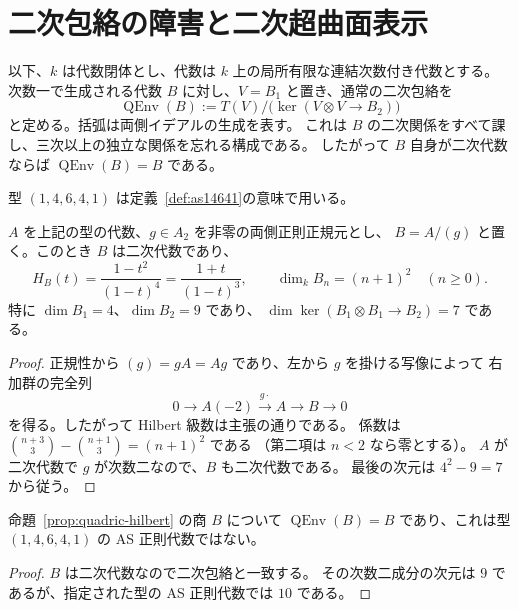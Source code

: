 \section{二次包絡の障害と二次超曲面表示}
\label{sec:quadric-envelope-obstruction}

以下、$k$ は代数閉体とし、代数は $k$ 上の局所有限な連結次数付き代数とする。
次数一で生成される代数 $B$ に対し、$V=B_1$ と置き、通常の二次包絡を
\[
 \operatorname{QEnv}(B)
 :=T(V)/\bigl(\ker(V\otimes V\longrightarrow B_2)\bigr)
\]
と定める。括弧は両側イデアルの生成を表す。
これは $B$ の二次関係をすべて課し、三次以上の独立な関係を忘れる構成である。
したがって $B$ 自身が二次代数ならば
$\operatorname{QEnv}(B)=B$ である。

型 $(1,4,6,4,1)$ は定義~\ref{def:as14641}の意味で用いる。

\begin{proposition}[次数二の正則元による商の数値]
\label{prop:quadric-hilbert}
$A$ を上記の型の代数、$g\in A_2$ を非零の両側正則正規元とし、
$B=A/(g)$ と置く。このとき $B$ は二次代数であり、
\[
 H_B(t)=\frac{1-t^2}{(1-t)^4}
       =\frac{1+t}{(1-t)^3},\qquad
 \dim_k B_n=(n+1)^2\quad(n\geq0).
\]
特に $\dim B_1=4$、$\dim B_2=9$ であり、
$\dim\ker(B_1\otimes B_1\to B_2)=7$ である。
\end{proposition}

\begin{proof}
正規性から $(g)=gA=Ag$ であり、左から $g$ を掛ける写像によって
右加群の完全列
\[
 0\longrightarrow A(-2)\xrightarrow{\,g\cdot\,}A
 \longrightarrow B\longrightarrow0
\]
を得る。したがって Hilbert 級数は主張の通りである。
係数は $\binom{n+3}{3}-\binom{n+1}{3}=(n+1)^2$ である
（第二項は $n<2$ なら零とする）。
$A$ が二次代数で $g$ が次数二なので、$B$ も二次代数である。
最後の次元は $4^2-9=7$ から従う。
\end{proof}

\begin{corollary}[通常の二次包絡を用いる定義の障害]
\label{cor:quadric-envelope-fails}
命題~\ref{prop:quadric-hilbert} の商 $B$ について
$\operatorname{QEnv}(B)=B$ であり、これは型 $(1,4,6,4,1)$ の
AS 正則代数ではない。
\end{corollary}

\begin{proof}
$B$ は二次代数なので二次包絡と一致する。
その次数二成分の次元は $9$ であるが、指定された型の AS 正則代数では
$10$ である。
\end{proof}

